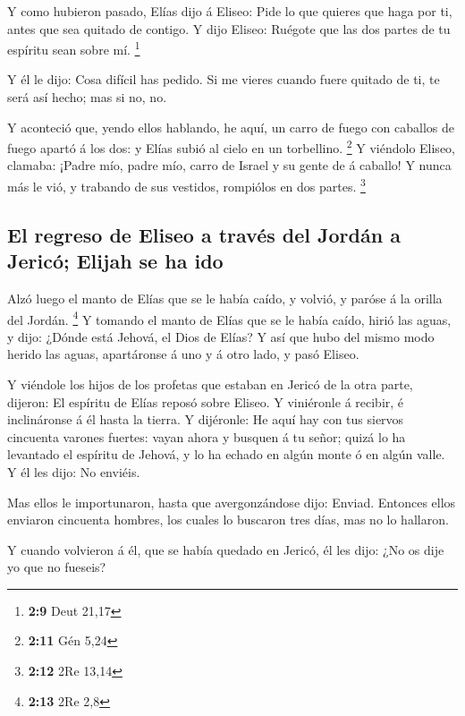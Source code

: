  Y como hubieron pasado, Elías dijo á Eliseo: Pide lo que
quieres que haga por ti, antes que sea quitado de contigo. Y dijo
Eliseo: Ruégote que las dos partes de tu espíritu sean sobre mí.
\footnote{\textbf{2:9} Deut 21,17}

 Y él le dijo: Cosa difícil has pedido. Si me vieres
cuando fuere quitado de ti, te será así hecho; mas si no, no.

 Y aconteció que, yendo ellos hablando, he aquí, un carro
de fuego con caballos de fuego apartó á los dos: y Elías subió al cielo
en un torbellino. \footnote{\textbf{2:11} Gén 5,24}  Y
viéndolo Eliseo, clamaba: ¡Padre mío, padre mío, carro de Israel y su
gente de á caballo! Y nunca más le vió, y trabando de sus vestidos,
rompiólos en dos partes. \footnote{\textbf{2:12} 2Re 13,14}

\hypertarget{el-regreso-de-eliseo-a-travuxe9s-del-jorduxe1n-a-jericuxf3-elijah-se-ha-ido}{%
\subsection{El regreso de Eliseo a través del Jordán a Jericó; Elijah se
ha
ido}\label{el-regreso-de-eliseo-a-travuxe9s-del-jorduxe1n-a-jericuxf3-elijah-se-ha-ido}}

 Alzó luego el manto de Elías que se le había caído, y
volvió, y paróse á la orilla del Jordán. \footnote{\textbf{2:13} 2Re 2,8}
 Y tomando el manto de Elías que se le había caído, hirió
las aguas, y dijo: ¿Dónde está Jehová, el Dios de Elías? Y así que hubo
del mismo modo herido las aguas, apartáronse á uno y á otro lado, y pasó
Eliseo.

 Y viéndole los hijos de los profetas que estaban en
Jericó de la otra parte, dijeron: El espíritu de Elías reposó sobre
Eliseo. Y viniéronle á recibir, é inclináronse á él hasta la tierra.
 Y dijéronle: He aquí hay con tus siervos cincuenta
varones fuertes: vayan ahora y busquen á tu señor; quizá lo ha levantado
el espíritu de Jehová, y lo ha echado en algún monte ó en algún valle. Y
él les dijo: No enviéis.

 Mas ellos le importunaron, hasta que avergonzándose
dijo: Enviad. Entonces ellos enviaron cincuenta hombres, los cuales lo
buscaron tres días, mas no lo hallaron.

 Y cuando volvieron á él, que se había quedado en Jericó,
él les dijo: ¿No os dije yo que no fueseis?

